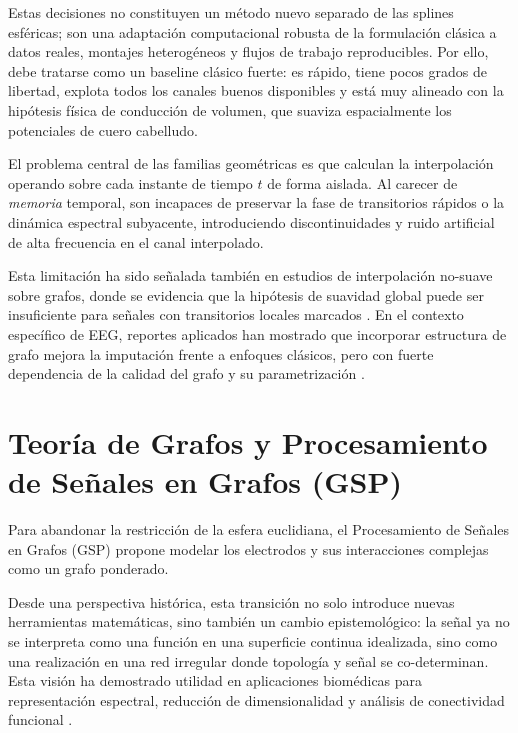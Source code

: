 Estas decisiones no constituyen un método nuevo separado de las splines esféricas; son una adaptación computacional robusta de la formulación clásica a datos reales, montajes heterogéneos y flujos de trabajo reproducibles. Por ello,  debe tratarse como un baseline clásico fuerte: es rápido, tiene pocos grados de libertad, explota todos los canales buenos disponibles y está muy alineado con la hipótesis física de conducción de volumen, que suaviza espacialmente los potenciales de cuero cabelludo.

El problema central de las familias geométricas es que calculan la interpolación operando sobre cada instante de tiempo $t$ de forma aislada. Al carecer de \textit{memoria} temporal, son incapaces de preservar la fase de transitorios rápidos o la dinámica espectral subyacente, introduciendo discontinuidades y ruido artificial de alta frecuencia en el canal interpolado.

Esta limitación ha sido señalada también en estudios de interpolación no-suave sobre grafos, donde se evidencia que la hipótesis de suavidad global puede ser insuficiente para señales con transitorios locales marcados \cite{mazarguil_non-smooth_2022}. En el contexto específico de EEG, reportes aplicados han mostrado que incorporar estructura de grafo mejora la imputación frente a enfoques clásicos, pero con fuerte dependencia de la calidad del grafo y su parametrización \cite{weinstein_imputing_2023, jiang_graph-based_2021}.

\section{Teoría de Grafos y Procesamiento de Señales en Grafos (GSP)}

Para abandonar la restricción de la esfera euclidiana, el Procesamiento de Señales en Grafos (GSP) \cite{shuman_emerging_2013, ortega_graph_2018-1, ortega_introduction_2022, leus_graph_2023} propone modelar los electrodos y sus interacciones complejas como un grafo ponderado. 

Desde una perspectiva histórica, esta transición no solo introduce nuevas herramientas matemáticas, sino también un cambio epistemológico: la señal ya no se interpreta como una función en una superficie continua idealizada, sino como una realización en una red irregular donde topología y señal se co-determinan. Esta visión ha demostrado utilidad en aplicaciones biomédicas para representación espectral, reducción de dimensionalidad y análisis de conectividad funcional \cite{rui_dimensionality_2016, miri_spectral_2024}.


